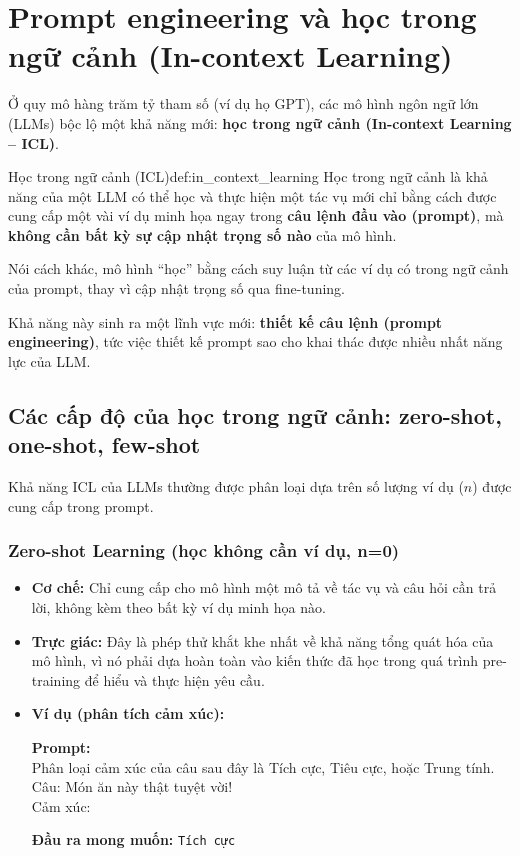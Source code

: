 
\section{Prompt engineering và học trong ngữ cảnh (In-context Learning)}
\label{sec:prompt_engineering_icl}

Ở quy mô hàng trăm tỷ tham số (ví dụ họ GPT), các mô hình ngôn ngữ lớn (LLMs) bộc lộ một khả năng mới: \textbf{học trong ngữ cảnh (In-context Learning -- ICL)}.

\begin{definition}{Học trong ngữ cảnh (ICL)}{def:in_context_learning}
    Học trong ngữ cảnh là khả năng của một LLM có thể học và thực hiện một tác vụ mới chỉ bằng cách được cung cấp một vài ví dụ minh họa ngay trong \textbf{câu lệnh đầu vào (prompt)}, mà \textbf{không cần bất kỳ sự cập nhật trọng số nào} của mô hình.
\end{definition}

Nói cách khác, mô hình “học” bằng cách suy luận từ các ví dụ có trong ngữ cảnh của prompt, thay vì cập nhật trọng số qua fine-tuning.

Khả năng này sinh ra một lĩnh vực mới: \textbf{thiết kế câu lệnh (prompt engineering)}, tức việc thiết kế prompt sao cho khai thác được nhiều nhất năng lực của LLM.

\subsection{Các cấp độ của học trong ngữ cảnh: zero-shot, one-shot, few-shot}
\label{ssec:shot_learning}

Khả năng ICL của LLMs thường được phân loại dựa trên số lượng ví dụ ($n$) được cung cấp trong prompt.

\subsubsection{Zero-shot Learning (học không cần ví dụ, n=0)}
\begin{itemize}
    \item \textbf{Cơ chế:} Chỉ cung cấp cho mô hình một mô tả về tác vụ và câu hỏi cần trả lời, không kèm theo bất kỳ ví dụ minh họa nào.
    \item \textbf{Trực giác:} Đây là phép thử khắt khe nhất về khả năng tổng quát hóa của mô hình, vì nó phải dựa hoàn toàn vào kiến thức đã học trong quá trình pre-training để hiểu và thực hiện yêu cầu.
    \item \textbf{Ví dụ (phân tích cảm xúc):}
        \begin{promptbox}
        \textbf{Prompt:} \\
        Phân loại cảm xúc của câu sau đây là Tích cực, Tiêu cực, hoặc Trung tính. \\
        Câu: Món ăn này thật tuyệt vời! \\
        Cảm xúc: 
        \end{promptbox}
        \textbf{Đầu ra mong muốn:} \texttt{Tích cực}
\end{itemize}

